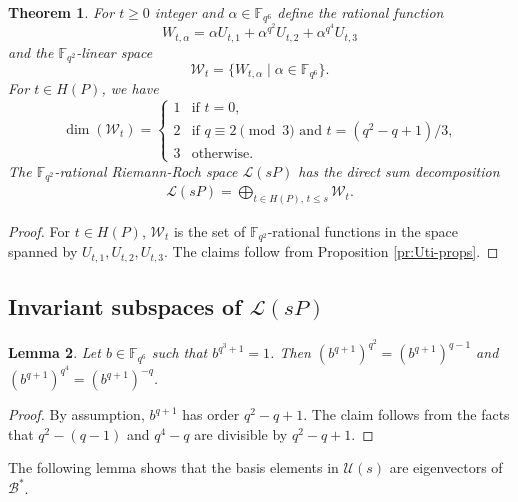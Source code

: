 \documentclass[11pt]{amsart}
\theoremstyle{plain}
\newtheorem{theorem}{Theorem}[section]
\newtheorem{lemma}[theorem]{Lemma}
\theoremstyle{definition}
\theoremstyle{remark}
\begin{document}
\begin{theorem} \label{th:Wt-props}
For $t\geq 0$ integer and $\alpha \in \mathbb{F}_{q^6}$ define the rational function 
\[W_{t,\alpha} = \alpha U_{t,1} + \alpha^{q^2} U_{t,2} + \alpha^{q^4} U_{t,3}\]
and the $\mathbb{F}_{q^2}$-linear space
\[\mathcal{W}_t = \{W_{t,\alpha} \mid \alpha \in \mathbb{F}_{q^6}\}.\]
For $t\in H(P)$, we have
\[\dim(\mathcal{W}_t) = \begin{cases}
1 & \text{if $t=0$,} \\
2 & \text{if $q\equiv 2\pmod3$ and $t=(q^2-q+1)/3$,} \\
3 & \text{otherwise.}
\end{cases}\]
The $\mathbb{F}_{q^2}$-rational Riemann-Roch space $\mathscr{L}(sP)$ has the direct sum decomposition
\begin{align} \label{eq:LsP-decomp}
\mathscr{L}(sP) = \bigoplus_{t\in H(P), \, t\leq s} \mathcal{W}_t.
\end{align}
\end{theorem}
\begin{proof}
For $t\in H(P)$, $\mathcal{W}_t$ is the set of $\mathbb{F}_{q^2}$-rational functions in the space spanned by $U_{t,1}, U_{t,2}, U_{t,3}$. The claims follow from Proposition \ref{pr:Uti-props}. 
\end{proof}

\subsection{Invariant subspaces of $\mathscr{L}(sP)$}

\begin{lemma} \label{lm:b-q+1}
Let $b\in \mathbb{F}_{q^6}$ such that $b^{q^3+1}=1$. Then $(b^{q+1})^{q^2}=(b^{q+1})^{q-1}$ and $(b^{q+1})^{q^4}=(b^{q+1})^{-q}$.
\end{lemma}
\begin{proof}
By assumption, $b^{q+1}$ has order $q^2-q+1$. The claim follows from the facts that $q^2-(q-1)$ and $q^4-q$ are divisible by $q^2-q+1$. 
\end{proof}

The following lemma shows that the basis elements in $\mathcal{U}(s)$ are eigenvectors of $\mathcal{B}^*$. 
\end{document}
